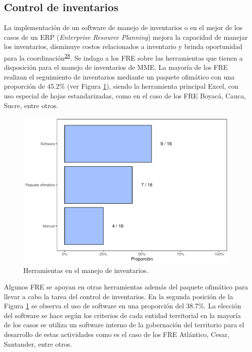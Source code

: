 \documentclass[
]{book}
\begin{document}
\hypertarget{control-de-inventarios}{%
\subsection{Control de inventarios}\label{control-de-inventarios}}

La implementación de un software de manejo de inventarios o en el mejor de los casos de un ERP (\emph{Enterprise Resource Planning}) mejora la capacidad de manejar los inventarios, disminuye costos relacionados a inventario y brinda oportunidad para la coordinación\textsuperscript{\protect\hyperlink{ref-Silver2017}{28}}. Se indago a los FRE sobre las herramientas que tienen a disposición para el manejo de inventarios de MME. La mayoría de los FRE realizan el seguimiento de inventarios mediante un paquete ofimático con una proporción de 45.2\% (ver Figura \ref{fig:HerramientasManejoInventarios}), siendo la herramienta principal Excel, con uso especial de hojas estandarizadas, como en el caso de los FRE Boyacá, Cauca, Sucre, entre otros.

\begin{figure}[t]

{\centering \includegraphics[width=0.95\linewidth]{InformeFinal_files/figure-latex/HerramientasManejoInventarios-1} 

}

\caption{Herramientas en el manejo de inventarios.}\label{fig:HerramientasManejoInventarios}
\end{figure}

Algunos FRE se apoyan en otras herramientas además del paquete ofimático para llevar a cabo la tarea del control de inventarios. En la segunda posición de la Figura \ref{fig:HerramientasManejoInventarios} se observa el uso de software en una proporción del 38.7\%. La elección del software se hace según los criterios de cada entidad territorial en la mayoría de los casos se utiliza un software interno de la gobernación del territorio para el desarrollo de estas actividades como es el caso de los FRE Atlántico, Cesar, Santander, entre otros.
\end{document}

